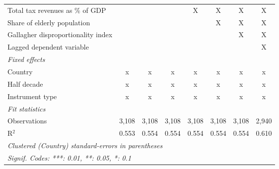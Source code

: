 \begin{table}[htbp]
\begin{tabular}{lccccccc}
      Total tax revenues as \% of GDP                                           &              &              &              & X            & X            & X            & X\\  
      Share of elderly population                                               &              &              &              &              & X            & X            & X\\  
      Gallagher disproportionality index                                        &              &              &              &              &              & X            & X\\  
      Lagged dependent variable                                                 &              &              &              &              &              &              & X\\  
      \emph{Fixed effects}\\
      Country                                                                   & x            & x            & x            & x            & x            & x            & x\\  
      Half decade                                                               & x            & x            & x            & x            & x            & x            & x\\  
      Instrument type                                                           & x            & x            & x            & x            & x            & x            & x\\  
      \midrule \emph{Fit statistics}\\
      Observations                                                              & 3,108        & 3,108        & 3,108        & 3,108        & 3,108        & 3,108        & 2,940\\  
      R$^2$                                                                     & 0.553        & 0.554        & 0.554        & 0.554        & 0.554        & 0.554        & 0.610\\  
      \midrule
      \multicolumn{8}{l}{\emph{Clustered (Country) standard-errors in parentheses}}\\
      \multicolumn{8}{l}{\emph{Signif. Codes: ***: 0.01, **: 0.05, *: 0.1}}\\
   \end{tabular}
\end{table}


